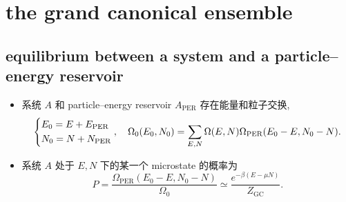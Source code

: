 \chapter{the grand canonical ensemble}
\section{equilibrium between a system and a particle--energy reservoir} \label{4.1}
\begin{itemize}
	\item 系统 $A$ 和 particle--energy reservoir $A_\text{PER}$ 存在能量和粒子交换,
	\begin{equation}
		\begin{dcases}
			E_0 = E + E_\text{PER} \\
			N_0 = N + N_\text{PER}
		\end{dcases}, \quad \Omega_0(E_0, N_0) = \sum_{E, N} \Omega(E, N) \Omega_\text{PER}(E_0 - E, N_0 - N).
	\end{equation}
	
	\item 系统 $A$ 处于 $E, N$ 下的某一个 microstate 的概率为
	\begin{equation}
		P = \frac{\Omega_\text{PER}(E_0 - E, N_0 - N)}{\Omega_0} \simeq \frac{e^{- \beta (E - \mu N)}}{Z_\text{GC}}.
	\end{equation}
\end{itemize}

